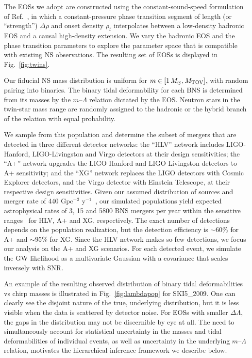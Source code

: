 \documentclass[aps,prl,twocolumn,superscriptaddress,footinbib]{revtex4-1}
\newcommand{\Msun}{\ensuremath{\,M_{\odot}}}
\begin{document}
The EOSs we adopt are constructed using the constant-sound-speed formulation of Ref.~\cite{HanSteiner2019}, in which a constant-pressure phase transition segment of length (or ``strength'') $\Delta\rho$ and onset density $\rho_t$ interpolates between a low-density hadronic EOS and a causal high-density extension. We vary the hadronic EOS and the phase transition parameters to explore the parameter space that is compatible with existing NS observations. The resulting set of EOSs is displayed in Fig.~\ref{fig:twins}.

Our fiducial NS mass distribution is uniform for $m \in [1\Msun,M_{\rm TOV}]$, with random pairing into binaries.
The binary tidal deformability for each BNS is determined from its masses by the $m$--$\Lambda$ relation dictated by the EOS. Neutron stars in the twin-star mass range are randomly assigned to the hadronic or the hybrid branch of the relation with equal probability. 

We sample from this population and determine the subset of mergers that are detected in three different detector networks: the ``HLV'' network includes LIGO-Hanford, LIGO-Livingston and Virgo detectors at their design sensitivities; the ``A+'' network upgrades the LIGO-Hanford and LIGO-Livingston detectors to A+ sensitivity; and the ``XG'' network replaces the LIGO detectors with Cosmic Explorer detectors, and the Virgo detector with Einstein Telescope, at their respective design sensitivities. Given our assumed distribution of sources and merger rate of 440 Gpc$^{-3}$ y$^{-1}$~\cite{LVK_O3bPop}, our simulated populations yield expected astrophysical rates of 3, 15 and 5800 BNS mergers per year within the sensitive ranges~\cite{AbbottAbbott2018_ObservingScenarios} for HLV, A+ and XG, respectively. The exact number of detections depends on the population realization, but the detection efficiency is $\sim60\%$ for A+ and $\sim95\%$ for XG. Since the HLV network makes so few detections, we focus our analysis on the A+ and XG scenarios. For each detected event, we simulate the GW likelihood as a multivariate Gaussian with a covariance that scales inversely with SNR.

An example of the resulting observed distribution of binary tidal deformabilities vs chirp masses is illustrated in Fig.~\ref{fig:lambdapop} for SKI5\_2009. One can clearly see the disjoint nature of the true, underlying distribution, but it is less visible when the data is scattered by detector noise. For EOSs with smaller $\Delta\Lambda$, the gaps in the distribution may not be discernible by eye at all. 
The need to simultaneously account for statistical uncertainty in the masses and tidal deformabilities of individual events, as well as uncertainty in the underlying $m$--$\Lambda$ relation, motivates the hierarchical inference framework we describe below.
\end{document}
